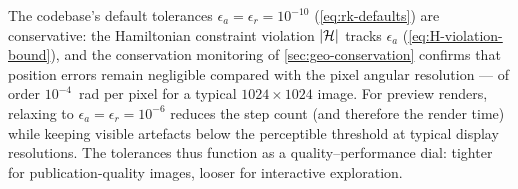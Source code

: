 The codebase's default tolerances $\epsilon_a = \epsilon_r = 10^{-10}$
(\cref{eq:rk-defaults}) are conservative: the Hamiltonian constraint
violation $\left\lvert \mathcal{H} \right\rvert$ tracks $\epsilon_a$
(\cref{eq:H-violation-bound}), and the conservation monitoring of
\cref{sec:geo-conservation} confirms that position errors remain
negligible compared with the pixel angular resolution --- of order
$10^{-4}$~rad per pixel for a typical $1024 \times 1024$ image.  For preview renders, relaxing to
$\epsilon_a = \epsilon_r = 10^{-6}$ reduces the step count (and
therefore the render time) while keeping visible artefacts below the
perceptible threshold at typical display resolutions.  The tolerances
thus function as a quality--performance dial: tighter for
publication-quality images, looser for interactive exploration.
